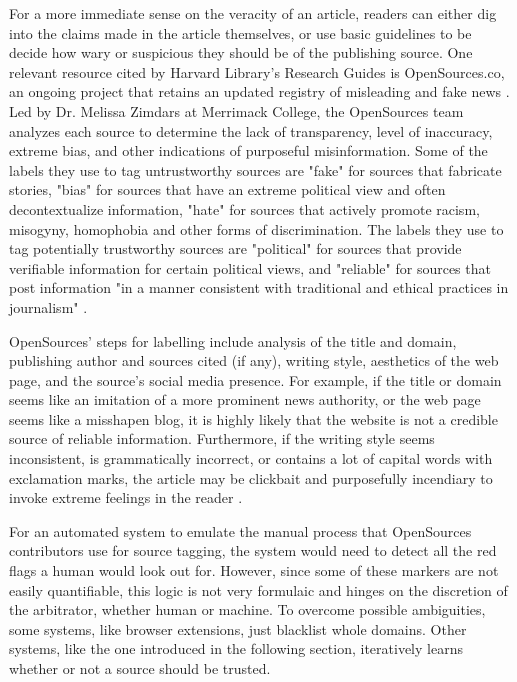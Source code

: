 For a more immediate sense on the veracity of an article, readers can either dig into the claims made in the article themselves, or use basic guidelines to be decide how wary or suspicious they should be of the publishing source.  One relevant resource cited by Harvard Library's Research Guides is OpenSources.co, an ongoing project that retains an updated registry of misleading and fake news \cite{harvardResearch}.  Led by Dr. Melissa Zimdars at Merrimack College, the OpenSources team analyzes each source to determine the lack of transparency, level of inaccuracy, extreme bias, and other indications of purposeful misinformation.  Some of the labels they use to tag untrustworthy sources are "fake" for sources that fabricate stories, "bias" for sources that have an extreme political view and often decontextualize information, "hate" for sources that actively promote racism, misogyny, homophobia and other forms of discrimination.  The labels they use to tag potentially trustworthy sources are "political" for sources that provide verifiable information for certain political views, and "reliable" for sources that post information "in a manner consistent with traditional and ethical practices in journalism" \cite{opensources}.

OpenSources' steps for labelling include analysis of the title and domain, publishing author and sources cited (if any), writing style, aesthetics of the web page, and the source's social media presence.  For example, if the title or domain seems like an imitation of a more prominent news authority, or the web page seems like a misshapen blog, it is highly likely that the website is not a credible source of reliable information.  Furthermore, if the writing style seems inconsistent, is grammatically incorrect, or contains a lot of capital words with exclamation marks, the article may be clickbait and purposefully incendiary to invoke extreme feelings in the reader \cite{opensources}.

For an automated system to emulate the manual process that OpenSources contributors use for source tagging, the system would need to detect all the red flags a human would look out for.  However, since some of these markers are not easily quantifiable, this logic is not very formulaic and hinges on the discretion of the arbitrator, whether human or machine.  To overcome possible ambiguities, some systems, like browser extensions, just blacklist whole domains.  Other systems, like the one introduced in the following section, iteratively learns whether or not a source should be trusted.


